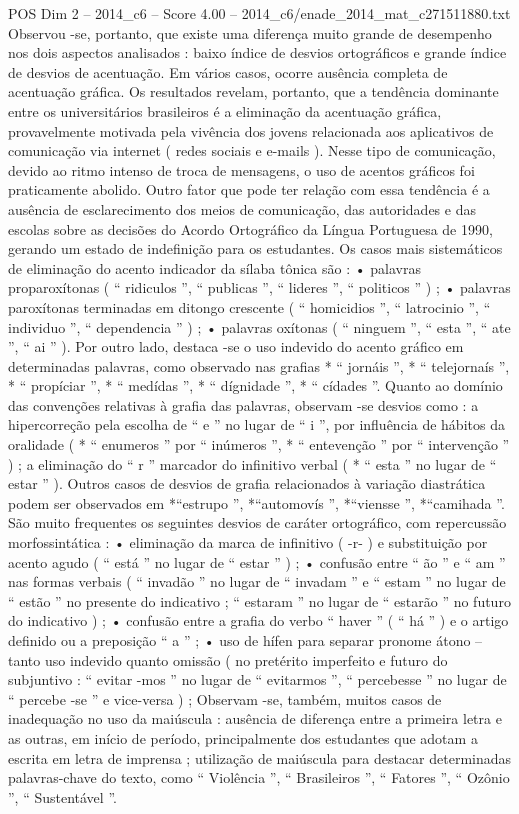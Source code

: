 \begin{textsample}{POS Dim 2 – 2014\_c6 – Score 4.00 – 2014\_c6/enade\_2014\_mat\_c271511880.txt}
Observou -se, portanto, que existe uma diferença muito grande de desempenho nos dois aspectos analisados : baixo índice de desvios ortográficos e grande índice de desvios de acentuação.
Em vários casos, ocorre ausência completa de acentuação gráfica.
Os resultados revelam, portanto, que a tendência dominante entre os universitários brasileiros é a eliminação da acentuação gráfica, provavelmente motivada pela vivência dos jovens relacionada aos aplicativos de comunicação via internet ( redes sociais e e-mails ).
Nesse tipo de comunicação, devido ao ritmo intenso de troca de mensagens, o uso de acentos gráficos foi praticamente abolido.
Outro fator que pode ter relação com essa tendência é a ausência de esclarecimento dos meios de comunicação, das autoridades e das escolas sobre as decisões do Acordo Ortográfico da Língua Portuguesa de 1990, gerando um estado de indefinição para os estudantes.
Os casos mais sistemáticos de eliminação do acento indicador da sílaba tônica são : • palavras proparoxítonas ( “ ridiculos ”, “ publicas ”, “ lideres ”, “ politicos ” ) ; • palavras paroxítonas terminadas em ditongo crescente ( “ homicidios ”, “ latrocinio ”, “ individuo ”, “ dependencia ” ) ; • palavras oxítonas ( “ ninguem ”, “ esta ”, “ ate ”, “ ai ” ).
Por outro lado, destaca -se o uso indevido do acento gráfico em determinadas palavras, como observado nas grafias * “ jornáis ”, * “ telejornaís ”, * “ propíciar ”, * “ medídas ”, * “ dígnidade ”, * “ cídades ”.
Quanto ao domínio das convenções relativas à grafia das palavras, observam -se desvios como : a hipercorreção pela escolha de “ e ” no lugar de “ i ”, por influência de hábitos da oralidade ( * “ enumeros ” por “ inúmeros ”, * “ entevenção ” por “ intervenção ” ) ; a eliminação do “ r ” marcador do infinitivo verbal ( * “ esta ” no lugar de “ estar ” ).
Outros casos de desvios de grafia relacionados à variação diastrática podem ser observados em *“estrupo ”, *“automovís ”, *“viensse ”, *“camihada ”.
São muito frequentes os seguintes desvios de caráter ortográfico, com repercussão morfossintática : • eliminação da marca de infinitivo ( -r- ) e substituição por acento agudo ( “ está ” no lugar de “ estar ” ) ; • confusão entre “ ão ” e “ am ” nas formas verbais ( “ invadão ” no lugar de “ invadam ” e “ estam ” no lugar de “ estão ” no presente do indicativo ; “ estaram ” no lugar de “ estarão ” no futuro do indicativo ) ; • confusão entre a grafia do verbo “ haver ” ( “ há ” ) e o artigo definido ou a preposição “ a ” ; • uso de hífen para separar pronome átono – tanto uso indevido quanto omissão ( no pretérito imperfeito e futuro do subjuntivo : “ evitar -mos ” no lugar de “ evitarmos ”, “ percebesse ” no lugar de “ percebe -se ” e vice-versa ) ; Observam -se, também, muitos casos de inadequação no uso da maiúscula : ausência de diferença entre a primeira letra e as outras, em início de período, principalmente dos estudantes que adotam a escrita em letra de imprensa ; utilização de maiúscula para destacar determinadas palavras-chave do texto, como “ Violência ”, “ Brasileiros ”, “ Fatores ”, “ Ozônio ”, “ Sustentável ”.

\end{textsample}
